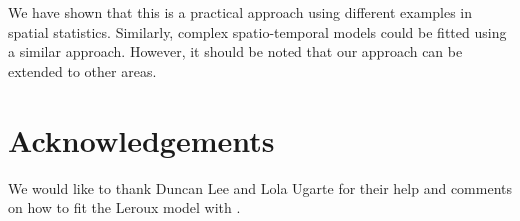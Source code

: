\documentclass[article]{jss}
\begin{document}
We have shown that this is a practical approach using different examples in
spatial statistics. Similarly, complex spatio-temporal models could be fitted
using a similar approach. However, it should be noted that our approach can be
extended to other areas.

\section*{Acknowledgements}

We would like to thank Duncan Lee and Lola Ugarte for their help and comments
on how to fit the Leroux model with .


%

\end{document}
